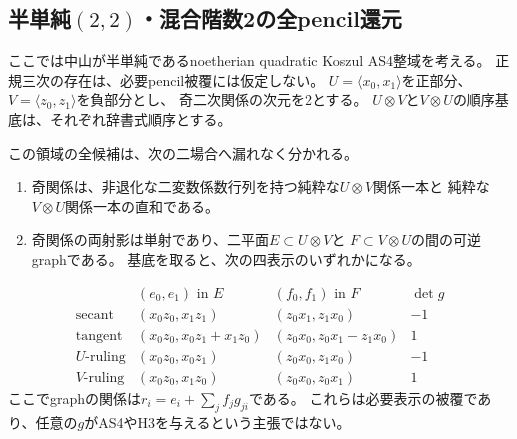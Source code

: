 \subsection{半単純$(2,2)$・混合階数2の全pencil還元}
\label{subsec:h3-order2-22-rank2}
ここでは中山が半単純であるnoetherian quadratic Koszul AS4整域を考える。
正規三次の存在は、必要pencil被覆には仮定しない。
$U=\langle x_0,x_1\rangle$を正部分、$V=\langle z_0,z_1\rangle$を負部分とし、
奇二次関係の次元を2とする。
$U\otimes V$と$V\otimes U$の順序基底は、それぞれ辞書式順序とする。
\begin{proposition}\label{prop:h3-order2-22-pencil-coverage}
この領域の全候補は、次の二場合へ漏れなく分かれる。
\begin{enumerate}
\item 奇関係は、非退化な二変数係数行列を持つ純粋な$U\otimes V$関係一本と
純粋な$V\otimes U$関係一本の直和である。
\item 奇関係の両射影は単射であり、二平面$E\subset U\otimes V$と
$F\subset V\otimes U$の間の可逆graphである。
基底を取ると、次の四表示のいずれかになる。
\end{enumerate}
\[
\begin{array}{c|c|c|c}
 & (e_0,e_1)\text{ in }E &(f_0,f_1)\text{ in }F&\det g\\\hline
\text{secant}&(x_0z_0,x_1z_1)&(z_0x_1,z_1x_0)&-1\\
\text{tangent}&(x_0z_0,x_0z_1+x_1z_0)&(z_0x_0,z_0x_1-z_1x_0)&1\\
U\text{-ruling}&(x_0z_0,x_0z_1)&(z_0x_0,z_1x_0)&-1\\
V\text{-ruling}&(x_0z_0,x_1z_0)&(z_0x_0,z_0x_1)&1
\end{array}
\]
ここでgraphの関係は$r_i=e_i+\sum_j f_jg_{ji}$である。
これらは必要表示の被覆であり、任意の$g$がAS4やH3を与えるという主張ではない。
\end{proposition}
